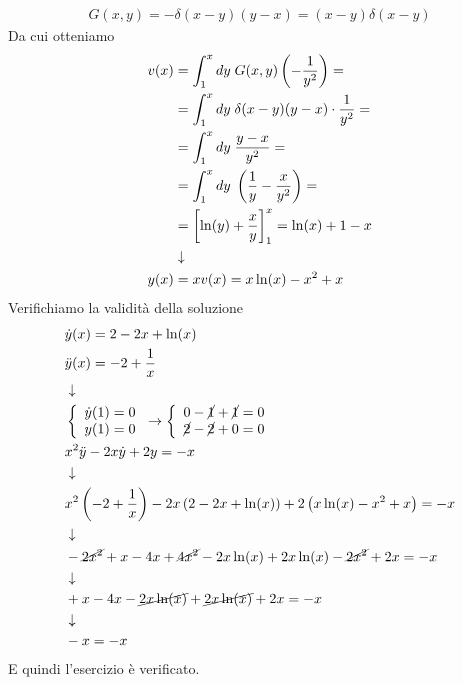 \begin{align}
	G(x,y) = - \delta (x-y) (y-x) = (x-y) \delta(x-y)
\end{align}
Da cui otteniamo
\begin{align}
	v(x) &= \int_{1}^x dy \;G(x,y) \left(-\frac{1}{y^2}\right) = \nonumber \\
	&= \int_{1}^x dy \; \delta (x-y) (y-x) \cdot \frac{1}{y^2}= \nonumber \\
	&= \int_{1}^x dy \; \frac{y-x}{y^2}= \nonumber \\
	&= \int_{1}^x dy \; \left(\frac{1}{y} - \frac{x}{y^2}\right)= \nonumber \\
	&= \left[ \ln(y) + \frac{x}{y} \right]_1^x = \ln(x) +1 -x \nonumber \\ &\downarrow \nonumber \\
	y(x) &= xv(x) = x\ln(x) - x^2 +x
\end{align}
Verifichiamo la validità della soluzione
\begin{align}
	&\dot{y}(x) = 2 - 2x + \ln(x)\\
	&\ddot{y}(x) = -2 + \frac{1}{x} \\ &\downarrow \nonumber \\
	&\left\{ \begin{array}{cc} \dot{y}(1) = 0\\ y(1) = 0 \end{array} \right. \to \left\{ \begin{array}{cc} 0 -\cancel{1} +\cancel{1} =0\\ \cancel{2}-\cancel{2} + 0 =0 \end{array} \right.\\
	&x^2 \ddot{y} - 2x \dot{y} + 2y = -x \\ &\downarrow \nonumber \\
	&x^2 \left( -2 + \frac{1}{x} \right) -2x \left( 2 - 2x + \ln(x) \right) + 2 \left( x\ln(x) - x^2 +x \right) = -x \nonumber \\ &\downarrow \nonumber \\
	& -\cancel{2x^2} + x - 4x + \cancel{4x^2} - 2x\ln(x) + 2x\ln(x) -\cancel{2x^2} +2x = -x \nonumber \\ &\downarrow \nonumber \\
	& + x - 4x - \cancel{2x\ln(x)} + \cancel{2x\ln(x)} +2x = -x \nonumber \\ &\downarrow \nonumber \\
	& -x = -x
\end{align}
E quindi l'esercizio è verificato.

\newpage

